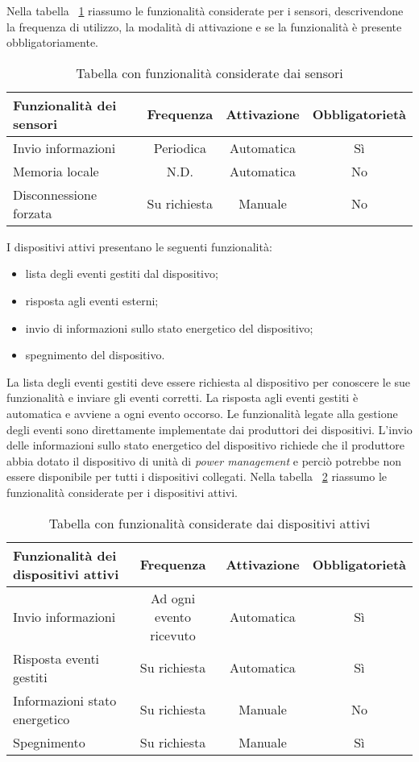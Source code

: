 Nella tabella ~\ref{tab:funz-sensori} riassumo le funzionalità considerate per i sensori, descrivendone la frequenza di utilizzo, la modalità di attivazione e se la funzionalità è presente obbligatoriamente.

\begin{table}[H]
\caption{Tabella con funzionalità considerate dai sensori}
\label{tab:funz-sensori}
\begin{tabularx}{\linewidth}{|X|c|c|c|}
\hline
\textbf{Funzionalità dei sensori} & \textbf{Frequenza} & \textbf{Attivazione} & \textbf{Obbligatorietà} \\
\hline
Invio informazioni & Periodica & Automatica & Sì \\
\hline
Memoria locale & N.D. & Automatica & No \\
\hline
Disconnessione forzata & Su richiesta & Manuale & No \\
\hline
\end{tabularx}
\end{table}

I dispositivi attivi presentano le seguenti funzionalità:
\begin{itemize}
	\item lista degli eventi gestiti dal dispositivo;
	\item risposta agli eventi esterni;
	\item invio di informazioni sullo stato energetico del dispositivo;
	\item spegnimento del dispositivo.
\end{itemize}

La lista degli eventi gestiti deve essere richiesta al dispositivo per conoscere le sue funzionalità e inviare gli eventi corretti.
La risposta agli eventi gestiti è automatica e avviene a ogni evento occorso.
Le funzionalità legate alla gestione degli eventi sono direttamente implementate dai produttori dei dispositivi.
L'invio delle informazioni sullo stato energetico del dispositivo richiede che il produttore abbia dotato il dispositivo di unità di \emph{power management} e perciò potrebbe non essere disponibile per tutti i dispositivi collegati.
Nella tabella ~\ref{tab:funz-disp-attivi} riassumo le funzionalità considerate per i dispositivi attivi.

\begin{table}[H]
\caption{Tabella con funzionalità considerate dai dispositivi attivi}
\label{tab:funz-disp-attivi}
\begin{tabularx}{\linewidth}{|X|c|c|c|}
\hline
\textbf{Funzionalità dei dispositivi attivi} & \textbf{Frequenza} & \textbf{Attivazione} & \textbf{Obbligatorietà} \\
\hline
Invio informazioni & Ad ogni evento ricevuto & Automatica & Sì \\
\hline
Risposta eventi gestiti & Su richiesta & Automatica & Sì \\
\hline
Informazioni stato energetico & Su richiesta & Manuale & No \\
\hline
Spegnimento & Su richiesta & Manuale & Sì \\
\hline
\end{tabularx}
\end{table}

